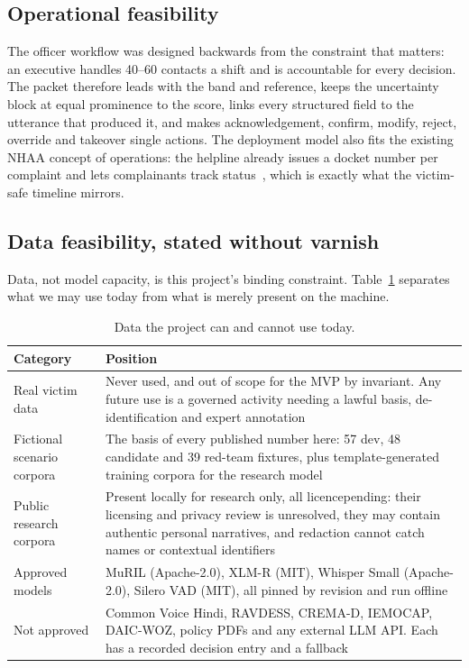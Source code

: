 \documentclass[11pt,a4paper]{article}
\newcommand{\codeus}{\textunderscore\allowbreak}
\DeclareRobustCommand{\code}[1]{{\ttfamily\let\_\codeus #1}}
\begin{document}
\subsection{Operational feasibility}
The officer workflow was designed backwards from the constraint that matters: an executive handles
40--60 contacts a shift and is accountable for every decision. The packet therefore leads with the
band and reference, keeps the uncertainty block at equal prominence to the score, links every
structured field to the utterance that produced it, and makes acknowledgement, confirm, modify,
reject, override and takeover single actions. The deployment model also fits the existing NHAA
concept of operations: the helpline already issues a docket number per complaint and lets
complainants track status~\cite{pib2021}, which is exactly what the victim-safe timeline mirrors.

\subsection{Data feasibility, stated without varnish}
Data, not model capacity, is this project's binding constraint. Table~\ref{tab:datafeas} separates
what we may use today from what is merely present on the machine.

\begin{table}[!htbp]
\centering\small
\caption{Data the project can and cannot use today.}
\label{tab:datafeas}
\begin{tabularx}{\linewidth}{@{}>{\raggedright\arraybackslash}p{4.2cm}X@{}}
\toprule
Category & Position \\
\midrule
Real victim data & Never used, and out of scope for the MVP by invariant. Any future use is a
governed activity needing a lawful basis, de-identification and expert annotation \\
Fictional scenario corpora & The basis of every published number here: 57 dev, 48 candidate and 39
red-team fixtures, plus template-generated training corpora for the research model \\
Public research corpora & Present locally for research only, all \code{licence\_pending}: their
licensing and privacy review is unresolved, they may contain authentic personal narratives, and
redaction cannot catch names or contextual identifiers \\
Approved models & MuRIL (Apache-2.0), XLM-R (MIT), Whisper Small (Apache-2.0), Silero VAD (MIT), all
pinned by revision and run offline \\
Not approved & Common Voice Hindi, RAVDESS, CREMA-D, IEMOCAP, DAIC-WOZ, policy PDFs and any external
LLM API. Each has a recorded decision entry and a fallback \\
\bottomrule
\end{tabularx}
\end{table}
\end{document}
